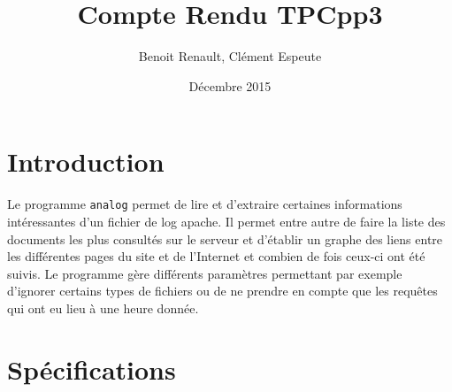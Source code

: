 \documentclass[11pt]{article}
\title{Compte Rendu TPCpp3}
\author{Benoit {\sc Renault}, Clément {\sc Espeute}}
\date{Décembre 2015}
\begin{document}
\maketitle

\section{Introduction}
Le programme \texttt{analog} permet de lire et d'extraire certaines informations intéressantes d'un fichier de log apache. Il permet entre autre de faire la liste des documents les plus consultés sur le serveur et d'établir un graphe des liens entre les différentes pages du site et de l'Internet et combien de fois ceux-ci ont été suivis. Le programme gère différents paramètres permettant par exemple d'ignorer certains types de fichiers ou de ne prendre en compte que les requêtes qui ont eu lieu à une heure donnée. 
\section{Spécifications}
\end{document}
